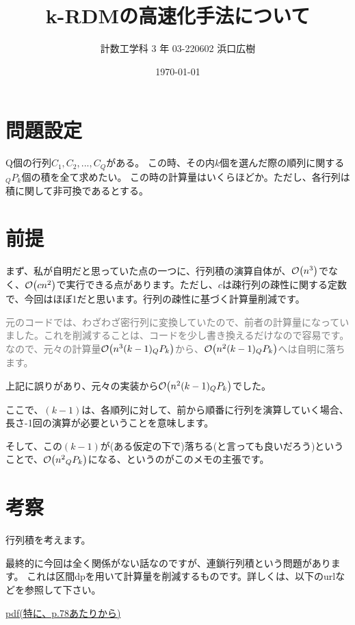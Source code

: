 \documentclass[a4paper, 10pt, dvipdfmx]{jlreq}
\begin{document}
\title{k-RDMの高速化手法について}
\author{計数工学科 3 年 03-220602 浜口広樹}
\date{\today}
\maketitle

\section{問題設定}

Q個の行列$C_1,C_2,...,C_Q$がある。
この時、その内$k$個を選んだ際の順列に関する${}_Q P_k$個の積を全て求めたい。
この時の計算量はいくらほどか。ただし、各行列は積に関して非可換であるとする。

\section{前提}

まず、私が自明だと思っていた点の一つに、行列積の演算自体が、$\order{n^3}$でなく、$\order{cn^2}$で実行できる点があります。ただし、$c$は疎行列の疎性に関する定数で、今回はほぼ1だと思います。行列の疎性に基づく計算量削減です。

\textcolor{gray}{
    元のコードでは、わざわざ密行列に変換していたので、前者の計算量になっていました。これを削減することは、コードを少し書き換えるだけなので容易です。
    なので、元々の計算量$\order{n^3 (k-1) {}_Q P_k}$から、$\order{n^2 (k-1) {}_Q P_k}$へは自明に落ちます。
}

上記に誤りがあり、元々の実装から$\order{n^2 (k-1) {}_Q P_k}$でした。

ここで、$(k-1)$は、各順列に対して、前から順番に行列を演算していく場合、長さ-1回の演算が必要ということを意味します。

そして、この$(k-1)$が(ある仮定の下で)落ちる(と言っても良いだろう)ということで、$\order{n^2 {}_Q P_k}$になる、というのがこのメモの主張です。

\section{考察}

行列積を考えます。

最終的に今回は全く関係がない話なのですが、連鎖行列積という問題があります。
これは区間dpを用いて計算量を削減するものです。詳しくは、以下のurlなどを参照して下さい。

\href{https://hcpc-hokudai.github.io/archive/dynamic_programming_002.pdf}{pdf(特に、p.78あたりから)}
\end{document}
